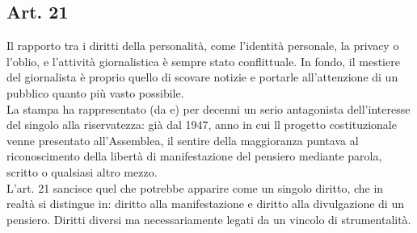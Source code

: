 \subsection{Art. 21}
Il rapporto tra i diritti della personalità, come l'identità personale, la privacy o l'oblio, e l'attività giornalistica è sempre stato conflittuale.
In fondo, il mestiere del giornalista è proprio quello di scovare notizie e portarle all'attenzione di un pubblico quanto più vasto possibile.
\\La stampa ha rappresentato (da e) per decenni un serio antagonista dell'interesse del singolo alla riservatezza: già dal 1947, anno in cui ll progetto costituzionale venne presentato all'Assemblea, il sentire della maggioranza puntava al riconoscimento della libertà di manifestazione del pensiero mediante parola, scritto o qualsiasi altro mezzo.
\\L'art. 21 sancisce quel che potrebbe apparire come un singolo diritto, che in realtà si distingue in: diritto alla manifestazione e diritto alla divulgazione di un pensiero. Diritti diversi ma necessariamente legati da un vincolo di strumentalità.

